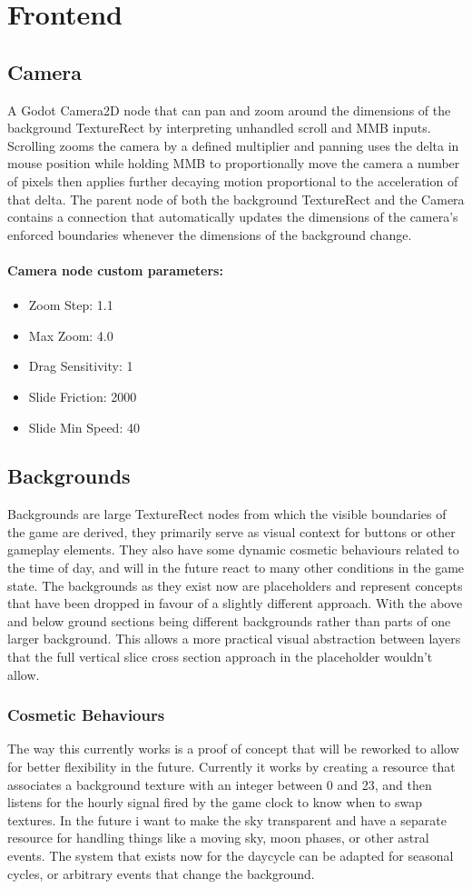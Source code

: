 \documentclass[12pt, a4paper]{scrreprt}
\begin{document}
	\chapter{Frontend}
	\section{Camera}
	A Godot Camera2D node that can pan and zoom around the dimensions of the background TextureRect by interpreting unhandled scroll and MMB inputs. Scrolling zooms the camera by a defined multiplier and panning uses the delta in mouse position while holding MMB to proportionally move the camera a number of pixels then applies further decaying motion proportional to the acceleration of that delta. The parent node of both the background TextureRect and the Camera contains a connection that automatically updates the dimensions of the camera's enforced boundaries whenever the dimensions of the background change.
	\subsubsection*{Camera node custom parameters:}
	\begin{itemize}
		\item Zoom Step: 1.1
		\item Max Zoom: 4.0
		\item Drag Sensitivity: 1
		\item Slide Friction: 2000
		\item Slide Min Speed: 40
	\end{itemize}
	\section{Backgrounds}
	Backgrounds are large TextureRect nodes from which the visible boundaries of the game are derived, they primarily serve as visual context for buttons or other gameplay elements. They also have some dynamic cosmetic behaviours related to the time of day, and will in the future react to many other conditions in the game state. The backgrounds as they exist now are placeholders and represent concepts that have been dropped in favour of a slightly different approach. With the above and below ground sections being different backgrounds rather than parts of one larger background. This allows a more practical visual abstraction between layers that the full vertical slice cross section approach in the placeholder wouldn't allow.
	\subsection{Cosmetic Behaviours}
	The way this currently works is a proof of concept that will be reworked to allow for better flexibility in the future. Currently it works by creating a resource that associates a background texture with an integer between 0 and 23, and then listens for the hourly signal fired by the game clock to know when to swap textures. In the future i want to make the sky transparent and have a separate resource for handling things like a moving sky, moon phases, or other astral events. The system that exists now for the daycycle can be adapted for seasonal cycles, or arbitrary events that change the background.
\end{document}
